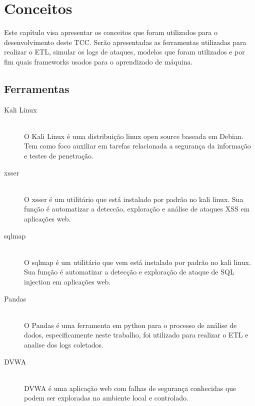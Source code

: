 
\chapter{Conceitos}
\label{cap:concepts}

Este capítulo visa apresentar os conceitos que foram utilizados para o desenvolvimento deste TCC. Serão apresentadas as ferramentas utilizadas para realizar o ETL, simular os logs de ataques, modelos que foram utilizados e por fim quais frameworks usados para o aprendizado de máquina.

\section{Ferramentas}

\begin{description}
    \item[Kali Linux] \hfill \\ 
        O Kali Linux é uma distribuição linux open source baseada em Debian. Tem como foco auxiliar em tarefas relacionada a segurança da informação e testes de penetração.
    \item[xsser] \hfill \\ 
        O xsser é um utilitário que está instalado por padrão no kali linux. Sua função é automatizar a deteccão, exploração e análise de ataques XSS em aplicações web.
    \item[sqlmap] \hfill \\ 
        O sqlmap é um utilitário que vem está instalado por padrão no kali linux. Sua função é automatizar a detecção e exploração de ataque de SQL injection em aplicações web.
    \item[Pandas] \hfill \\ 
        O Pandas é uma ferramenta  em python para o processo de análise de dados, especificamente neste trabalho, foi utilizado para realizar o ETL e analise dos logs coletados.
    \item[DVWA] \hfill \\ 
        DVWA é uma aplicação web com falhas de segurança conhecidas que podem ser exploradas no ambiente local e controlado.
  \end{description}

